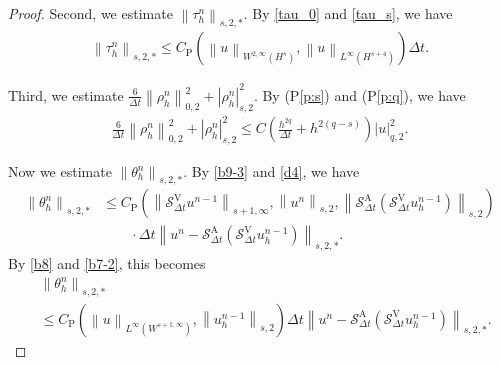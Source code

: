 \documentclass[10pt,a4paper]{amsart}
\def\norm#1#2{\left\|#2\right\|_{#1}}
\def\snorm#1#2{\left|#2\right|_{#1}}
\begin{document}
\begin{proof}
  Second, we estimate $ \norm{s, 2, \ast}{\tau_h^n} $. By \eqref{tau_0} and \eqref{tau_s}, we have 
  \begin{align} 
    \norm{s, 2, \ast}{\tau_h^n} \leq C_{\mathrm{P}} (\norm{W^{2, \infty}(H^{s})}{u}, \norm{L^{\infty}(H^{s+4})}{u}) \Delta t. \label{b28}
  \end{align} 

  Third, we estimate $ \frac{6}{\Delta t} \norm{0,2}{\rho_h^n}^2 + \snorm{s,2}{\rho_h^n}^2 $. 
  By (P\ref{p:s}) and (P\ref{p:q}), we have 
  \begin{align}
    \frac{6}{\Delta t} \norm{0, 2}{\rho_h^n}^2 + \snorm{s, 2}{\rho_h^n}^2 \leq C\left(\frac{h^{2q}}{\Delta t} + h^{2 (q - s)}\right)\snorm{q, 2}{u}^2. \label{b31}
  \end{align}

  Now we estimate $ \norm{s, 2, \ast}{\theta_h^n} $. By \eqref{b9-3} and \eqref{d4}, we have 
  \begin{align} 
    \norm{s, 2, \ast}{\theta_h^n} 
    & \leq C_{\mathrm{P}} (\norm{s + 1, \infty}{\mathcal{S}_{\Delta t}^{\mathrm{V}} u^{n - 1}}, \norm{s, 2}{u^n}, \norm{s, 2}{\mathcal{S}_{\Delta t}^{\mathrm{A}} (\mathcal{S}_{\Delta t}^{\mathrm{V}} u_h^{n - 1})}) \\ & \qquad \cdot \Delta t
    \norm{s, 2, \ast}{u^n - \mathcal{S}_{\Delta t}^{\mathrm{A}} (\mathcal{S}_{\Delta t}^{\mathrm{V}} u_h^{n - 1})}. \label{b10-4} 
  \end{align} 
  By \eqref{b8} and \eqref{b7-2}, this becomes 
  \begin{align} 
    & \norm{s, 2, \ast}{\theta_h^n} \\ & \leq C_{\mathrm{P}} (\norm{L^\infty (W^{s + 1, \infty})}{u}, \norm{s, 2}{u_h^{n - 1}}) \Delta t \norm{s, 2, \ast}{u^n - \mathcal{S}_{\Delta t}^{\mathrm{A}} (\mathcal{S}_{\Delta t}^{\mathrm{V}} u_h^{n - 1})}.  \label{b10} 
  \end{align} 

\end{proof}
\end{document}
